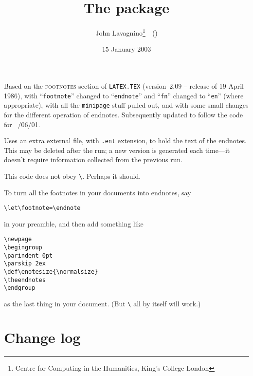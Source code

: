 \documentclass[pagesize=auto]{scrartcl}
\title{The \pkg{endnotes} package}
\author{John Lavagnino\thanks{Centre for Computing in the Humanities, King's College London}~~(\mail{John.Lavagnino@kcl.ac.uk})}
\date{15 January 2003}
\makeatletter
\newcommand*{\cs}[1]{\texttt{\textbackslash#1}}
\newcommand*{\cmd}[1]{\cs{\expandafter\@gobble\string#1}}
\newcommand*{\env}[1]{\texttt{#1}}
\makeatother
\begin{document}
\maketitle

\noindent
Based on the \textsc{footnotes} section of
\texttt{LATEX.TEX} (version~2.09 -- release of 19 April 1986), with
``\texttt{footnote}'' changed to ``\texttt{endnote}'' and ``\texttt{fn}'' changed to ``\texttt{en}'' (where
appropriate), with all the \env{minipage} stuff pulled out, and with
some small changes for the different operation of endnotes.
Subsequently updated to follow the code for
\LaTeXe\ /06/01\textrangle.

Uses an extra external file, with \texttt{.ent} extension, to hold the
text of the endnotes.  This may be deleted after the run; a new
version is generated each time---it doesn't require information
collected from the previous run.

This code does not obey \cmd{\nofiles}.  Perhaps it should.

\bigskip

To turn all the footnotes in your documents into endnotes, say
%
\begin{verbatim}
\let\footnote=\endnote
\end{verbatim}
%
in your preamble, and then add something like
%
\begin{verbatim}
\newpage
\begingroup
\parindent 0pt
\parskip 2ex
\def\enotesize{\normalsize}
\theendnotes
\endgroup
\end{verbatim}
%
as the last thing in your document.  (But \cmd{\theendnotes} all
by itself will work.)


\section{Change log}

\renewcommand*{\labelenumi}{\theenumi)}
\end{document}
